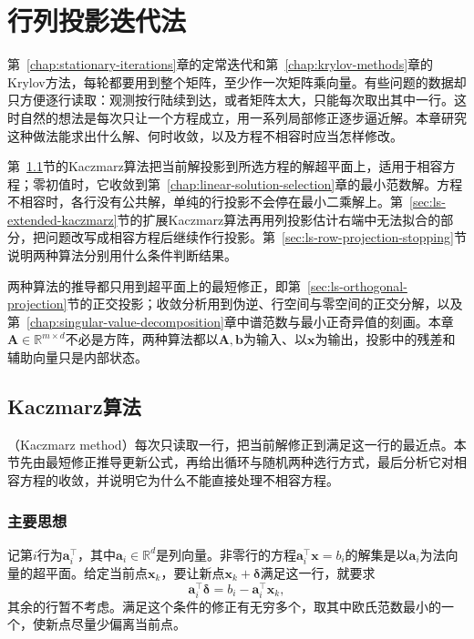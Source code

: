 \chapter{行列投影迭代法}
\label{sec:ls-row-projection}
\label{chap:row-projection-methods}

第~\ref{chap:stationary-iterations}章的定常迭代和第~\ref{chap:krylov-methods}章的Krylov方法，每轮都要用到整个矩阵，至少作一次矩阵乘向量。有些问题的数据却只方便逐行读取：观测按行陆续到达，或者矩阵太大，只能每次取出其中一行。这时自然的想法是每次只让一个方程成立，用一系列局部修正逐步逼近解。本章研究这种做法能求出什么解、何时收敛，以及方程不相容时应当怎样修改。

第~\ref{sec:ls-kaczmarz}节的Kaczmarz算法把当前解投影到所选方程的解超平面上，适用于相容方程；零初值时，它收敛到第~\ref{chap:linear-solution-selection}章的最小范数解。方程不相容时，各行没有公共解，单纯的行投影不会停在最小二乘解上。第~\ref{sec:ls-extended-kaczmarz}节的扩展Kaczmarz算法再用列投影估计右端中无法拟合的部分，把问题改写成相容方程后继续作行投影。第~\ref{sec:ls-row-projection-stopping}节说明两种算法分别用什么条件判断结果。

两种算法的推导都只用到超平面上的最短修正，即第~\ref{sec:ls-orthogonal-projection}节的正交投影；收敛分析用到伪逆、行空间与零空间的正交分解，以及第~\ref{chap:singular-value-decomposition}章中谱范数与最小正奇异值的刻画。本章$\bm A\in\mathbb R^{m\times d}$不必是方阵，两种算法都以$\bm A,\bm b$为输入、以$\bm x$为输出，投影中的残差和辅助向量只是内部状态。

\section{Kaczmarz算法}
\label{sec:ls-kaczmarz}

（Kaczmarz method）每次只读取一行，把当前解修正到满足这一行的最近点。本节先由最短修正推导更新公式，再给出循环与随机两种选行方式，最后分析它对相容方程的收敛，并说明它为什么不能直接处理不相容方程。

\subsection{主要思想}

记第$i$行为$\bm a_i^\top$，其中$\bm a_i\in\mathbb R^d$是列向量。非零行的方程$\bm a_i^\top\bm x=b_i$的解集是以$\bm a_i$为法向量的超平面。给定当前点$\bm x_k$，要让新点$\bm x_k+\bm\delta$满足这一行，就要求
\[
 \bm a_i^\top\bm\delta=b_i-\bm a_i^\top\bm x_k ,
\]
其余的行暂不考虑。满足这个条件的修正有无穷多个，取其中欧氏范数最小的一个，使新点尽量少偏离当前点。

